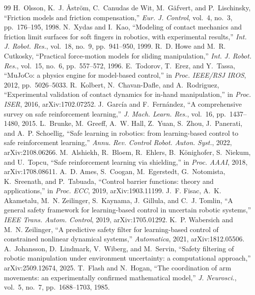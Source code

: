 \begin{thebibliography}{99}
 H.~Olsson, K.~J. {\AA}str{\"o}m, C.~Canudas de Wit, M.~G{\"a}fvert, and P.~Lischinsky, ``Friction models and friction compensation,'' \emph{Eur. J. Control}, vol.~4, no.~3, pp.~176--195, 1998.
 N.~Xydas and I.~Kao, ``Modeling of contact mechanics and friction limit surfaces for soft fingers in robotics, with experimental results,'' \emph{Int. J. Robot. Res.}, vol.~18, no.~9, pp.~941--950, 1999.
 R.~D. Howe and M.~R. Cutkosky, ``Practical force-motion models for sliding manipulation,'' \emph{Int. J. Robot. Res.}, vol.~15, no.~6, pp.~557--572, 1996.
 E.~Todorov, T.~Erez, and Y.~Tassa, ``MuJoCo: a physics engine for model-based control,'' in \emph{Proc. IEEE/RSJ IROS}, 2012, pp.~5026--5033.
 R.~Kolbert, N.~Chavan-Dafle, and A.~Rodriguez, ``Experimental validation of contact dynamics for in-hand manipulation,'' in \emph{Proc. ISER}, 2016, arXiv:1702.07252.
 J.~Garc{\'i}a and F.~Fern{\'a}ndez, ``A comprehensive survey on safe reinforcement learning,'' \emph{J. Mach. Learn. Res.}, vol.~16, pp.~1437--1480, 2015.
 L.~Brunke, M.~Greeff, A.~W. Hall, Z.~Yuan, S.~Zhou, J.~Panerati, and A.~P. Schoellig, ``Safe learning in robotics: from learning-based control to safe reinforcement learning,'' \emph{Annu. Rev. Control Robot. Auton. Syst.}, 2022, arXiv:2108.06266.
 M.~Alshiekh, R.~Bloem, R.~Ehlers, B.~K{\"o}nighofer, S.~Niekum, and U.~Topcu, ``Safe reinforcement learning via shielding,'' in \emph{Proc. AAAI}, 2018, arXiv:1708.08611.
 A.~D. Ames, S.~Coogan, M.~Egerstedt, G.~Notomista, K.~Sreenath, and P.~Tabuada, ``Control barrier functions: theory and applications,'' in \emph{Proc. ECC}, 2019, arXiv:1903.11199.
 J.~F. Fisac, A.~K. Akametalu, M.~N. Zeilinger, S.~Kaynama, J.~Gillula, and C.~J. Tomlin, ``A general safety framework for learning-based control in uncertain robotic systems,'' \emph{IEEE Trans. Autom. Control}, 2019, arXiv:1705.01292.
 K.~P. Wabersich and M.~N. Zeilinger, ``A predictive safety filter for learning-based control of constrained nonlinear dynamical systems,'' \emph{Automatica}, 2021, arXiv:1812.05506.
 A.~Johansson, D.~Lindmark, V.~Wiberg, and M.~Servin, ``Safety filtering of robotic manipulation under environment uncertainty: a computational approach,'' arXiv:2509.12674, 2025.
 T.~Flash and N.~Hogan, ``The coordination of arm movements: an experimentally confirmed mathematical model,'' \emph{J. Neurosci.}, vol.~5, no.~7, pp.~1688--1703, 1985.

\end{thebibliography}
